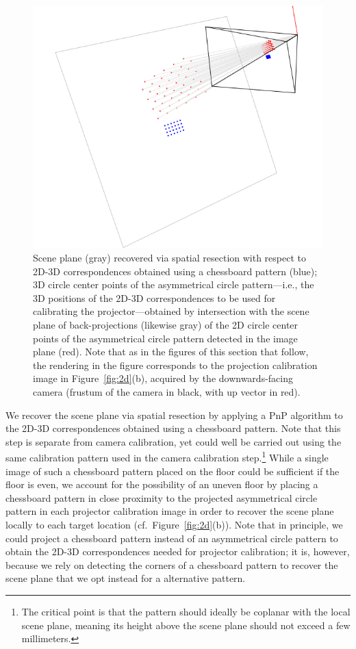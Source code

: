 \documentclass[review]{elsarticle}
\begin{document}
\begin{figure}
    \centerline{\includegraphics[scale=.35]{images/2d3d.png}}
    \caption{Scene plane (gray) recovered via spatial resection with respect to 2D-3D correspondences obtained using a chessboard pattern (blue); 3D circle center points of the asymmetrical circle pattern---i.e., the 3D positions of the 2D-3D correspondences to be used for calibrating the projector---obtained by intersection with the scene plane of back-projections (likewise gray) of the 2D circle center points of the asymmetrical circle pattern detected in the image plane (red). Note that as in the figures of this section that follow, the rendering in the figure corresponds to the projection calibration image in Figure~\ref{fig:2d}(b), acquired by the downwards-facing camera (frustum of the camera in black, with up vector in red).}
    \label{fig:3d}
\end{figure}

We recover the scene plane via spatial resection by applying a PnP algorithm \cite{collins2014infinitesimal} to the 2D-3D correspondences obtained using a chessboard pattern. Note that this step is separate from camera calibration, yet could well be carried out using the same calibration pattern used in the camera calibration step.\footnote{The critical point is that the pattern should ideally be coplanar with the local scene plane, meaning its height above the scene plane should not exceed a few millimeters.} While a single image of such a chessboard pattern placed on the floor could be sufficient if the floor is even, we account for the possibility of an uneven floor by placing a chessboard pattern in close proximity to the projected asymmetrical circle pattern in each projector calibration image in order to recover the scene plane locally to each target location (cf.\ Figure~\ref{fig:2d}(b)). Note that in principle, we could project a chessboard pattern instead of an asymmetrical circle pattern to obtain the 2D-3D correspondences needed for projector calibration; it is, however, because we rely on detecting the corners of a chessboard pattern to recover the scene plane that we opt instead for a alternative pattern.
\end{document}
